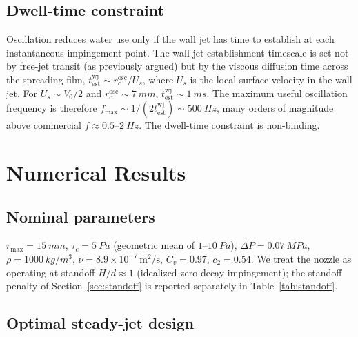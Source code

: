\documentclass[aps,prfluids,reprint,amsmath,amssymb,floatfix]{revtex4-2}
\begin{document}
\subsection{Dwell-time constraint}

Oscillation reduces water use only if the wall jet has time to establish
at each instantaneous impingement point. The wall-jet establishment
timescale is set not by free-jet transit (as previously argued) but by
the viscous diffusion time across the spreading film,
$t_\mathrm{est}^\mathrm{wj} \sim r_c^\mathrm{osc}/U_s$, where
$U_s$ is the local surface velocity in the wall jet. For $U_s \sim V_0/2$
and $r_c^\mathrm{osc} \sim \SI{7}{mm}$, $t_\mathrm{est}^\mathrm{wj}
\sim \SI{1}{ms}$. The maximum useful oscillation frequency is therefore
$f_\mathrm{max} \sim 1/(2 t_\mathrm{est}^\mathrm{wj}) \sim \SI{500}{Hz}$,
many orders of magnitude above commercial $f \approx 0.5$--$\SI{2}{Hz}$.
The dwell-time constraint is non-binding.

\section{Numerical Results}
\label{sec:numerics}

\subsection{Nominal parameters}

$r_\mathrm{max} = \SI{15}{mm}$, $\tau_c = \SI{5}{Pa}$ (geometric mean of
$1$--$\SI{10}{Pa}$), $\Delta P = \SI{0.07}{MPa}$, $\rho = \SI{1000}{kg/m^3}$,
$\nu = 8.9\times 10^{-7}\,\mathrm{m^2/s}$, $C_v = 0.97$, $c_2 = 0.54$.
We treat the nozzle as operating at standoff $H/d \approx 1$ (idealized
zero-decay impingement); the standoff penalty of Section~\ref{sec:standoff}
is reported separately in Table~\ref{tab:standoff}.

\subsection{Optimal steady-jet design}
\end{document}
